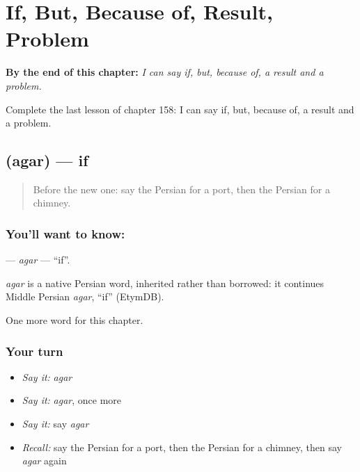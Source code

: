 
\chapter{If, But, Because of, Result, Problem}
\label{ch:fa-if-but-because-of-result-problem}

\begin{chapteropening}
\textbf{By the end of this chapter:} \emph{I can say if, but, because of, a result and a problem.}

Complete the last lesson of chapter 158: I can say if, but, because of, a result and a problem.
\end{chapteropening}

\section[\texorpdfstring{\fa{اگر} (agar)}{اگر (agar)}]{ (agar) — if}

\label{lesson:FA-C158-agar}



\begin{quote}
Before the new one: say the Persian for a port, then the Persian for a chimney.
\end{quote}

\subsection*{You'll want to know: }
\textbf{} — \emph{agar} — \textquotedblleft{}if\textquotedblright{}.

\begin{cousinweb}
\emph{agar} is a native Persian word, inherited rather than borrowed: it continues Middle Persian \emph{agar}, \textquotedblleft{}if\textquotedblright{} (EtymDB).
\end{cousinweb}

\begin{grammarlens}[title={What you've built}]
One more word for this chapter.
\end{grammarlens}

\subsection*{Your turn}
\begin{itemize}
\raggedright
  \item \emph{Say it:} \emph{agar}
  \item \emph{Say it:} \emph{agar}, once more
  \item \emph{Say it:} say \emph{agar}
  \item \emph{Recall:} say the Persian for a port, then the Persian for a chimney, then say \emph{agar} again
\end{itemize}

